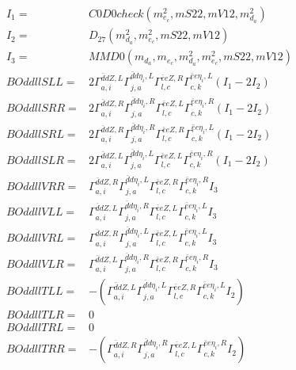 \documentclass[A4,landscape]{article}
\begin{document}
\begin{align} 
I_1 = & C0D0check(m^2_{e_{{c}}}, mS22, mV12, m^2_{d_{{a}}}) \\ 
I_2 = & D_{27}(m^2_{d_{{a}}}, m^2_{e_{{c}}}, mS22, mV12) \\ 
I_3 = & MMD0(m_{d_{{a}}}, m_{e_{{c}}}, m^2_{d_{{a}}}, m^2_{e_{{c}}}, mS22, mV12) \\ 
  BOddllSLL= & 2  \Gamma^{\bar{d}d Z ,L}_{a, i} \Gamma^{\bar{d}d \eta_i ,L}_{j, a} \Gamma^{\bar{e}e Z ,R}_{l, c} \Gamma^{\bar{e}e \eta_i ,L}_{c, k} (I_1 - 2 I_2) \\ 
  BOddllSRR= & 2  \Gamma^{\bar{d}d Z ,R}_{a, i} \Gamma^{\bar{d}d \eta_i ,R}_{j, a} \Gamma^{\bar{e}e Z ,L}_{l, c} \Gamma^{\bar{e}e \eta_i ,R}_{c, k} (I_1 - 2 I_2) \\ 
  BOddllSRL= & 2  \Gamma^{\bar{d}d Z ,R}_{a, i} \Gamma^{\bar{d}d \eta_i ,R}_{j, a} \Gamma^{\bar{e}e Z ,R}_{l, c} \Gamma^{\bar{e}e \eta_i ,L}_{c, k} (I_1 - 2 I_2) \\ 
  BOddllSLR= & 2  \Gamma^{\bar{d}d Z ,L}_{a, i} \Gamma^{\bar{d}d \eta_i ,L}_{j, a} \Gamma^{\bar{e}e Z ,L}_{l, c} \Gamma^{\bar{e}e \eta_i ,R}_{c, k} (I_1 - 2 I_2) \\ 
  BOddllVRR= &  \Gamma^{\bar{d}d Z ,R}_{a, i} \Gamma^{\bar{d}d \eta_i ,L}_{j, a} \Gamma^{\bar{e}e Z ,R}_{l, c} \Gamma^{\bar{e}e \eta_i ,R}_{c, k} I_3 \\ 
  BOddllVLL= &  \Gamma^{\bar{d}d Z ,L}_{a, i} \Gamma^{\bar{d}d \eta_i ,R}_{j, a} \Gamma^{\bar{e}e Z ,L}_{l, c} \Gamma^{\bar{e}e \eta_i ,L}_{c, k} I_3 \\ 
  BOddllVRL= &  \Gamma^{\bar{d}d Z ,R}_{a, i} \Gamma^{\bar{d}d \eta_i ,L}_{j, a} \Gamma^{\bar{e}e Z ,L}_{l, c} \Gamma^{\bar{e}e \eta_i ,L}_{c, k} I_3 \\ 
  BOddllVLR= &  \Gamma^{\bar{d}d Z ,L}_{a, i} \Gamma^{\bar{d}d \eta_i ,R}_{j, a} \Gamma^{\bar{e}e Z ,R}_{l, c} \Gamma^{\bar{e}e \eta_i ,R}_{c, k} I_3 \\ 
  BOddllTLL= & -( \Gamma^{\bar{d}d Z ,L}_{a, i} \Gamma^{\bar{d}d \eta_i ,L}_{j, a} \Gamma^{\bar{e}e Z ,R}_{l, c} \Gamma^{\bar{e}e \eta_i ,L}_{c, k} I_2) \\ 
  BOddllTLR= & 0 \\ 
  BOddllTRL= & 0 \\ 
  BOddllTRR= & -( \Gamma^{\bar{d}d Z ,R}_{a, i} \Gamma^{\bar{d}d \eta_i ,R}_{j, a} \Gamma^{\bar{e}e Z ,L}_{l, c} \Gamma^{\bar{e}e \eta_i ,R}_{c, k} I_2) \\ 
\end{align} 
\end{document}
